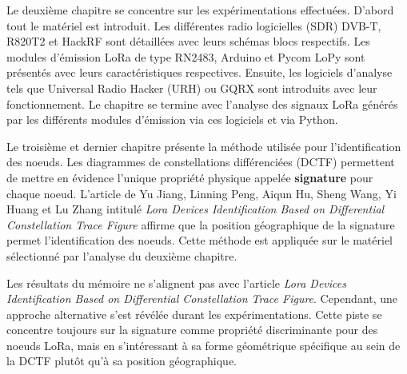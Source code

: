 \documentclass[a4paper,11pt]{article}
\begin{document}
\vspace{0.2cm}

\noindent Le deuxième chapitre se concentre sur les expérimentations effectuées. D'abord tout le matériel est introduit. Les différentes radio logicielles (SDR) DVB-T, R820T2 et HackRF sont détaillées avec leurs schémas blocs respectifs. Les modules d'émission LoRa de type RN2483, Arduino et Pycom LoPy sont présentés avec leurs caractéristiques respectives. Ensuite, les logiciels d'analyse tels que Universal Radio Hacker (URH) ou GQRX sont introduits avec leur fonctionnement. Le chapitre se termine avec l'analyse des signaux LoRa générés par les différents modules d'émission via ces logiciels et via Python.

\vspace{0.2cm}

\noindent Le troisième et dernier chapitre présente la méthode utilisée pour l'identification des noeuds. Les diagrammes de constellations différenciées (DCTF) permettent de mettre en évidence l'unique propriété physique appelée \textbf{signature} pour chaque noeud. L'article de Yu Jiang, Linning Peng, Aiqun Hu, Sheng Wang, Yi Huang et Lu Zhang intitulé \textit{Lora Devices Identification Based on Differential Constellation Trace Figure} affirme que la position géographique de la signature permet l'identification des noeuds. Cette méthode est appliquée sur le matériel sélectionné par l'analyse du deuxième chapitre.

\vspace{0.2cm}

\noindent Les résultats du mémoire ne s'alignent pas avec l'article \textit{Lora Devices Identification Based on Differential Constellation Trace Figure}. Cependant, une approche alternative s'est révélée durant les expérimentations. Cette piste se concentre toujours sur la signature comme propriété discriminante pour des noeuds LoRa, mais en s'intéressant à sa forme géométrique spécifique au sein de la DCTF plutôt qu'à sa position géographique.
\end{document}
